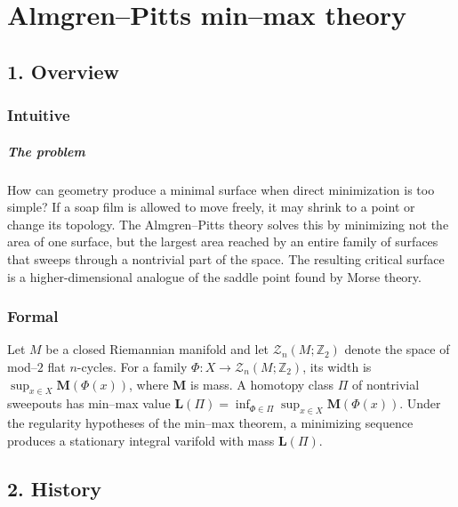 \clearpage\chapter{Almgren--Pitts min--max theory}
\section*{1. Overview}
\subsection*{Intuitive}
\paragraph{The problem}

How can geometry produce a minimal surface when direct minimization is too simple? If a soap film is allowed to move freely, it may shrink to a point or change its topology. The Almgren--Pitts theory solves this by minimizing not the area of one surface, but the largest area reached by an entire family of surfaces that sweeps through a nontrivial part of the space. The resulting critical surface is a higher-dimensional analogue of the saddle point found by Morse theory.



\subsection*{Formal}
Let $M$ be a closed Riemannian manifold and let $\mathcal Z_n(M;\mathbb Z_2)$ denote the space of mod--$2$ flat $n$-cycles. For a family $\Phi:X\to\mathcal Z_n(M;\mathbb Z_2)$, its width is $\sup_{x\in X}\mathbf M(\Phi(x))$, where $\mathbf M$ is mass. A homotopy class $\Pi$ of nontrivial sweepouts has min--max value $\mathbf L(\Pi)=\inf_{\Phi\in\Pi}\sup_{x\in X}\mathbf M(\Phi(x))$. Under the regularity hypotheses of the min--max theorem, a minimizing sequence produces a stationary integral varifold with mass $\mathbf L(\Pi)$.
\section*{2. History}
